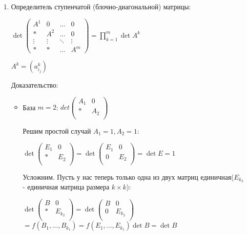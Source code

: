 \begin{enumerate}
    \item Определитель ступенчатой (блочно-диагональной) матрицы:

          \(\det
          \begin{pmatrix}
              A^1    & 0      & \ldots & 0      \\
              *      & A^2    & \ldots & 0      \\
              \vdots & \vdots & \ddots & \vdots \\
              *      & *      & \ldots & A^m
          \end{pmatrix} = \prod\limits_{k=1}^m \det A^k\)


          \(A^k = (a_{i_j}^k)\)

          Доказательство:
          \begin{itemize}
              \item База \(m = 2\):
                    \(det\begin{pmatrix}
                        A_1 & 0   \\
                        *   & A_2 \\
                    \end{pmatrix}\)


                    Решим простой случай \(A_1 = 1, A_2 = 1\):

                    \(\det\begin{pmatrix}
                        E_1 & 0   \\
                        *   & E_2 \\
                    \end{pmatrix} =
                    \det\begin{pmatrix}
                        E_1 & 0   \\
                        0   & E_2 \\
                    \end{pmatrix} = \det E = 1\)\


                    Усложним. Пусть у нас теперь только одна из двух матриц единичная(\(E_{k_2}\) - единичная матрица размера \(k \times k\)):


                    \(\det\begin{pmatrix}
                        B & 0       \\
                        * & E_{k_2} \\
                    \end{pmatrix} =
                    \det\begin{pmatrix}
                        B & 0       \\
                        0 & E_{k_2} \\
                    \end{pmatrix} \)
                    \(= f(B_1, \ldots, B_{k_1}) = f(E_1, \ldots, E_{k_1}) \det B = \det B\)


\end{itemize}
\end{enumerate}
